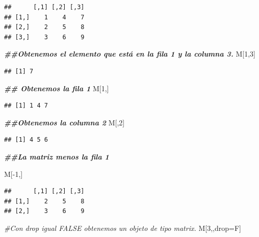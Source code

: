 \documentclass[
  12pt,
]{book}
\newenvironment{Shaded}{\begin{snugshade}}{\end{snugshade}}
\newcommand{\CommentTok}[1]{\textcolor[rgb]{0.56,0.35,0.01}{\textit{#1}}}
\newcommand{\DecValTok}[1]{\textcolor[rgb]{0.00,0.00,0.81}{#1}}
\newcommand{\DocumentationTok}[1]{\textcolor[rgb]{0.56,0.35,0.01}{\textbf{\textit{#1}}}}
\newcommand{\NormalTok}[1]{#1}
\newcommand{\OtherTok}[1]{\textcolor[rgb]{0.56,0.35,0.01}{#1}}
\newcommand{\SpecialCharTok}[1]{\textcolor[rgb]{0.00,0.00,0.00}{#1}}
\begin{document}
\begin{verbatim}
##      [,1] [,2] [,3]
## [1,]    1    4    7
## [2,]    2    5    8
## [3,]    3    6    9
\end{verbatim}

\begin{Shaded}
\begin{Highlighting}[]
\DocumentationTok{\#\#Obtenemos el elemento que está en la fila 1 y la columna 3.}
\NormalTok{M[}\DecValTok{1}\NormalTok{,}\DecValTok{3}\NormalTok{]}
\end{Highlighting}
\end{Shaded}

\begin{verbatim}
## [1] 7
\end{verbatim}

\begin{Shaded}
\begin{Highlighting}[]
\DocumentationTok{\#\# Obtenemos la fila 1 }
\NormalTok{M[}\DecValTok{1}\NormalTok{,]}
\end{Highlighting}
\end{Shaded}

\begin{verbatim}
## [1] 1 4 7
\end{verbatim}

\begin{Shaded}
\begin{Highlighting}[]
\DocumentationTok{\#\#Obtenemos la columna 2}
\NormalTok{M[,}\DecValTok{2}\NormalTok{]}
\end{Highlighting}
\end{Shaded}

\begin{verbatim}
## [1] 4 5 6
\end{verbatim}

\begin{Shaded}
\begin{Highlighting}[]
\DocumentationTok{\#\#La matriz menos la fila 1}

\NormalTok{M[}\SpecialCharTok{{-}}\DecValTok{1}\NormalTok{,]}
\end{Highlighting}
\end{Shaded}

\begin{verbatim}
##      [,1] [,2] [,3]
## [1,]    2    5    8
## [2,]    3    6    9
\end{verbatim}

\begin{Shaded}
\begin{Highlighting}[]
\CommentTok{\#Con drop igual FALSE obtenemos un objeto de tipo matrix.}
\NormalTok{M[}\DecValTok{3}\NormalTok{,,drop}\OtherTok{=}\NormalTok{F]}
\end{Highlighting}
\end{Shaded}
\end{document}
